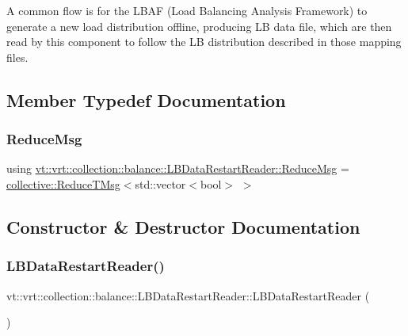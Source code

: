 A common flow is for the L\+B\+AF (Load Balancing Analysis Framework) to generate a new load distribution offline, producing LB data file, which are then read by this component to follow the LB distribution described in those mapping files. 

\subsection{Member Typedef Documentation}
\mbox{\label{structvt_1_1vrt_1_1collection_1_1balance_1_1_l_b_data_restart_reader_a59e2b9e568683c89c9af430adacba420}} 
\subsubsection{\texorpdfstring{Reduce\+Msg}{ReduceMsg}}
{\footnotesize\ttfamily using \hyperlink{structvt_1_1vrt_1_1collection_1_1balance_1_1_l_b_data_restart_reader_a59e2b9e568683c89c9af430adacba420}{vt\+::vrt\+::collection\+::balance\+::\+L\+B\+Data\+Restart\+Reader\+::\+Reduce\+Msg} =  \hyperlink{namespacevt_1_1collective_a28b82d5d48c9bc6e4fd738fcbf9e0f62}{collective\+::\+Reduce\+T\+Msg}$<$std\+::vector$<$bool$>$ $>$}



\subsection{Constructor \& Destructor Documentation}
\mbox{\label{structvt_1_1vrt_1_1collection_1_1balance_1_1_l_b_data_restart_reader_a66d7aad803c86006eb72e95d46aa945a}} 
\subsubsection{\texorpdfstring{L\+B\+Data\+Restart\+Reader()}{LBDataRestartReader()}}
{\footnotesize\ttfamily vt\+::vrt\+::collection\+::balance\+::\+L\+B\+Data\+Restart\+Reader\+::\+L\+B\+Data\+Restart\+Reader (\begin{DoxyParamCaption}{ }\end{DoxyParamCaption})\hspace{0.3cm}{\ttfamily [default]}}




